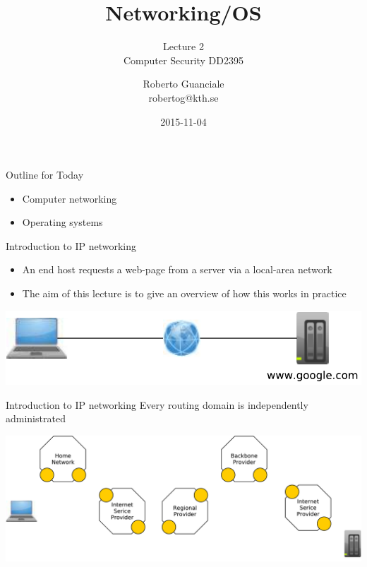 \documentclass{beamer}
\title{Networking/OS}
\subtitle{Lecture 2 \\ Computer Security DD2395}
\author[R. Guanciale]{
  Roberto Guanciale\\
  robertog@kth.se
}
\date{2015-11-04}
\begin{document}
\begin{frame}[plain]
  \titlepage
\end{frame}

\begin{frame}{Outline for Today}
  \begin{itemize}
    \item Computer networking
    \item Operating systems
  \end{itemize}
\end{frame}

\begin{frame}{Introduction to IP networking}
  \begin{itemize}
    \item An end host requests a web-page from a server via a local-area
      network
    \item The aim of this lecture is to give an overview of how this works
in practice
  \end{itemize}
  \begin{center}
    \includegraphics[width=0.5\linewidth]{net0}
  \end{center}
\end{frame}

\begin{frame}{Introduction to IP networking}
  Every routing domain is independently administrated
  \begin{center}
    \includegraphics[width=0.8\linewidth]{net1}
  \end{center}
\end{frame}
\end{document}
